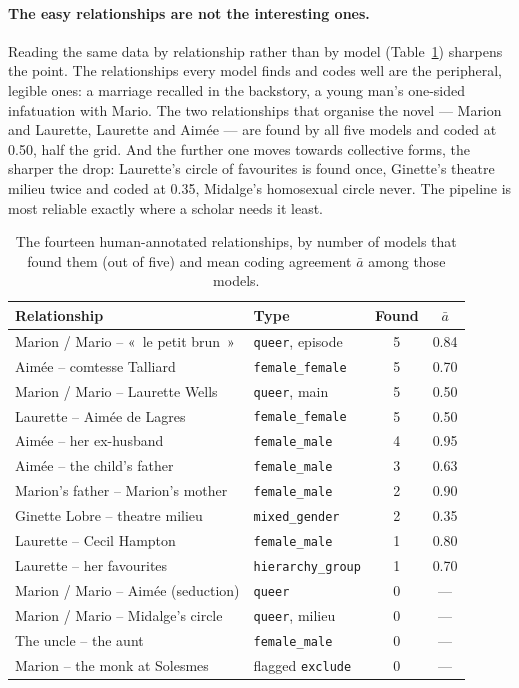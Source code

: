 \paragraph{The easy relationships are not the interesting ones.} Reading the same
data by relationship rather than by model (Table~\ref{tab:relation-results}) sharpens
the point. The relationships every model finds and codes well are the peripheral,
legible ones: a marriage recalled in the backstory, a young man's one-sided
infatuation with Mario. The two relationships that organise the novel --- Marion and
Laurette, Laurette and Aimée --- are found by all five models and coded at 0.50,
half the grid. And the further one moves towards collective forms, the sharper the
drop: Laurette's circle of favourites is found once, Ginette's theatre milieu twice
and coded at 0.35, Midalge's homosexual circle never. The pipeline is most reliable
exactly where a scholar needs it least.

\begin{table}[h]
  \centering
  \small
  \begin{tabular}{llcc}
    \toprule
    Relationship & Type & Found & $\bar a$ \\
    \midrule
    Marion / Mario -- «~le petit brun~» & \texttt{queer}, episode & 5 & 0.84 \\
    Aimée -- comtesse Talliard       & \texttt{female\_female}    & 5 & 0.70 \\
    Marion / Mario -- Laurette Wells & \texttt{queer}, main       & 5 & 0.50 \\
    Laurette -- Aimée de Lagres      & \texttt{female\_female}    & 5 & 0.50 \\
    Aimée -- her ex-husband          & \texttt{female\_male}      & 4 & 0.95 \\
    Aimée -- the child's father      & \texttt{female\_male}      & 3 & 0.63 \\
    Marion's father -- Marion's mother & \texttt{female\_male}    & 2 & 0.90 \\
    Ginette Lobre -- theatre milieu  & \texttt{mixed\_gender}     & 2 & 0.35 \\
    Laurette -- Cecil Hampton        & \texttt{female\_male}      & 1 & 0.80 \\
    Laurette -- her favourites       & \texttt{hierarchy\_group}  & 1 & 0.70 \\
    \midrule
    Marion / Mario -- Aimée (seduction) & \texttt{queer}           & 0 & --- \\
    Marion / Mario -- Midalge's circle  & \texttt{queer}, milieu   & 0 & --- \\
    The uncle -- the aunt               & \texttt{female\_male}    & 0 & --- \\
    Marion -- the monk at Solesmes      & flagged \texttt{exclude} & 0 & --- \\
    \bottomrule
  \end{tabular}
  \caption{The fourteen human-annotated relationships, by number of models that found
  them (out of five) and mean coding agreement $\bar a$ among those models.}
  \label{tab:relation-results}
\end{table}

